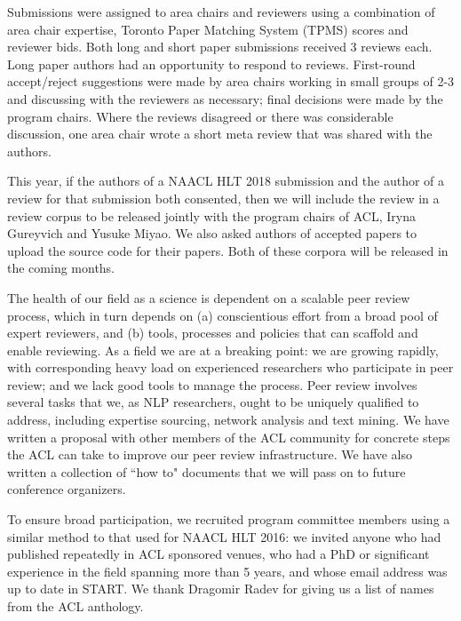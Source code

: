 Submissions were assigned to area chairs and reviewers using a combination of area chair expertise, Toronto Paper Matching System (TPMS) scores and reviewer bids. Both long and short paper submissions received 3 reviews each. Long paper authors had an opportunity to respond to reviews. First-round accept/reject suggestions were made by area chairs working in small groups of 2-3 and discussing with the reviewers as necessary; final decisions were made by the program chairs. Where the reviews disagreed or there was considerable discussion, one area chair wrote a short meta review that was shared with the authors. 

This year, if the authors of a NAACL HLT 2018 submission and the author of a review for that submission both consented, then we will include the review in a review corpus to be released jointly with the program chairs of ACL, Iryna Gureyvich and Yusuke Miyao. We also asked authors of accepted papers to upload the source code for their papers. Both of these corpora will be released in the coming months.

The health of our field as a science is dependent on a scalable peer review process, which in turn depends on (a) conscientious effort from a broad pool of expert reviewers, and (b)  tools, processes and policies that can scaffold and enable reviewing. As a field we are at a breaking point: we are growing rapidly, with corresponding  heavy load on experienced researchers who participate in peer review; and we lack good tools to manage the process. Peer review involves several tasks that we, as NLP researchers, ought to be uniquely qualified to address, including expertise sourcing, network analysis and text mining. We have written a proposal with other members of the ACL community for concrete steps the ACL can take to improve our peer review infrastructure. We have also written a collection of ``how to" documents that we will pass on to future conference organizers. 

 To ensure broad participation, we recruited program committee members using a similar method to that used for NAACL HLT 2016: we invited anyone who had published repeatedly in ACL sponsored venues, who had a PhD or significant experience in the field spanning more than 5 years, and whose email address was up to date in START. We thank Dragomir Radev for giving us a list of names from the ACL anthology. 

